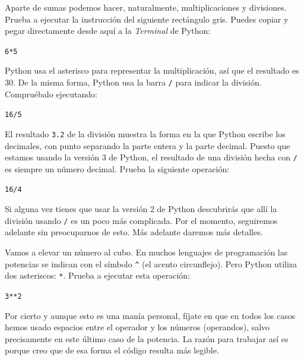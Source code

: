 \documentclass[10pt,a4paper]{article}\usepackage[]{graphicx}\usepackage[]{color}
\makeatletter
\newcommand{\hlnum}[1]{\textcolor[rgb]{0.686,0.059,0.569}{#1}}%
\newcommand{\hlopt}[1]{\textcolor[rgb]{0,0,0}{#1}}%
\newenvironment{kframe}{%
 \def\at@end@of@kframe{}%
 \ifinner\ifhmode%
  \def\at@end@of@kframe{\end{minipage}}%
  \begin{minipage}{\columnwidth}%
 \fi\fi%
 \def\FrameCommand##1{\hskip\@totalleftmargin \hskip-\fboxsep
 \colorbox{shadecolor}{##1}\hskip-\fboxsep
     \hskip-\linewidth \hskip-\@totalleftmargin \hskip\columnwidth}%
 \MakeFramed {\advance\hsize-\width
   \@totalleftmargin\z@ \linewidth\hsize
   \@setminipage}}%
 {\par\unskip\endMakeFramed%
 \at@end@of@kframe}
\newenvironment{knitrout}{}{} %
\makeatother
\begin{document}
Aparte de sumas podemos hacer, naturalmente, multiplicaciones y divisiones. Prueba a ejecutar la instrucción del siguiente rectángulo gris. Puedes copiar y pegar directamente desde aquí a la {\em Terminal} de Python:
\begin{knitrout}
\color{fgcolor}\begin{kframe}
\begin{alltt}
\hlnum{6} \hlopt{*} \hlnum{5}
\end{alltt}
\end{kframe}
\end{knitrout}
Python usa el asterisco para representar la multiplicación, así que el resultado es 30. De la misma forma, Python usa la barra {\tt /} para indicar la división. Compruébalo ejecutando:
\begin{knitrout}
\color{fgcolor}\begin{kframe}
\begin{alltt}
\hlnum{16} \hlopt{/} \hlnum{5}
\end{alltt}
\end{kframe}
\end{knitrout}
El resultado {\tt 3.2} de la división muestra la forma en la que Python escribe los decimales, con punto separando la parte entera y la parte decimal. Puesto que estamos usando la versión 3 de Python, el resultado de una división hecha con {\tt /} es siempre un número decimal. Prueba la siguiente operación:
\begin{knitrout}
\color{fgcolor}\begin{kframe}
\begin{alltt}
\hlnum{16} \hlopt{/} \hlnum{4}
\end{alltt}
\end{kframe}
\end{knitrout}
Si alguna vez tienes que usar la versión 2 de Python descubrirás que allí la división usando {\tt /} es un poco más complicada. Por el momento, seguiremos adelante sin preocuparnos de esto. Más adelante daremos más detalles.

Vamos a elevar un número al cubo. En muchos lenguajes de programación las potencias se indican con el símbolo \verb#^# (el acento circunflejo). Pero Python utiliza dos asteriscos: {\tt **}. Prueba a ejecutar esta operación:

\begin{knitrout}
\color{fgcolor}\begin{kframe}
\begin{alltt}
\hlnum{3}\hlopt{**}\hlnum{2}
\end{alltt}
\end{kframe}
\end{knitrout}
Por cierto y aunque esto es una manía personal, fíjate en que en todos los casos hemos usado espacios entre el operador y los números (operandos), salvo precisamente en este último caso de la potencia. La razón para trabajar así es porque creo que de esa forma el código resulta más legible.
\end{document}
